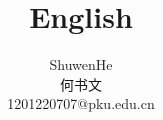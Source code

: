 \documentclass[12pt,twiside,a4paper]{ctexbook}
\numberwithin{chapter}{part}
\begin{document}

\author
{
ShuwenHe\\
何书文\\
1201220707@pku.edu.cn
}


\title{English}
\maketitle
\tableofcontents %
\newpage
\pagestyle{fancy}

\end{document}
